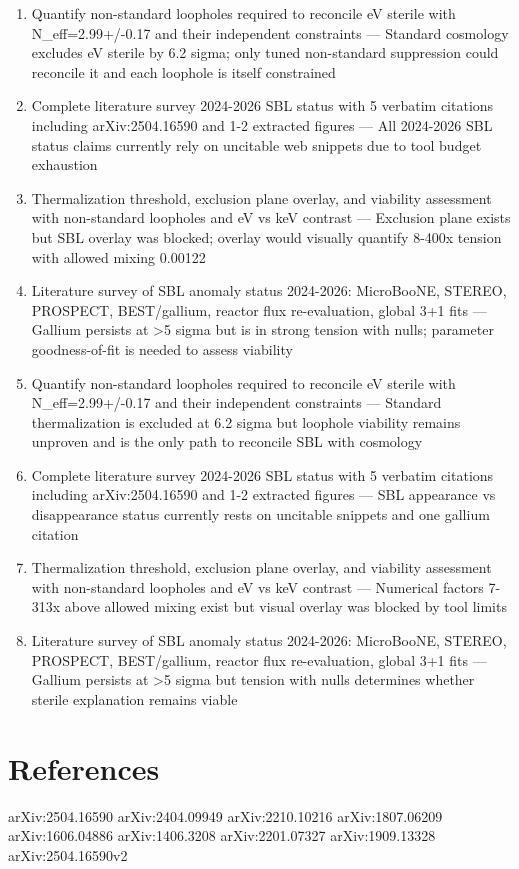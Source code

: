 \documentclass[11pt,a4paper]{article}
\begin{document}
\begin{enumerate}
  \item Quantify non-standard loopholes required to reconcile eV sterile with N\_eff=2.99+/-0.17 and their independent constraints --- Standard cosmology excludes eV sterile by 6.2 sigma; only tuned non-standard suppression could reconcile it and each loophole is itself constrained
  \item Complete literature survey 2024-2026 SBL status with 5 verbatim citations including arXiv:2504.16590 and 1-2 extracted figures --- All 2024-2026 SBL status claims currently rely on uncitable web snippets due to tool budget exhaustion
  \item Thermalization threshold, exclusion plane overlay, and viability assessment with non-standard loopholes and eV vs keV contrast --- Exclusion plane exists but SBL overlay was blocked; overlay would visually quantify 8-400x tension with allowed mixing 0.00122
  \item Literature survey of SBL anomaly status 2024-2026: MicroBooNE, STEREO, PROSPECT, BEST/gallium, reactor flux re-evaluation, global 3+1 fits --- Gallium persists at \textgreater{}5 sigma but is in strong tension with nulls; parameter goodness-of-fit is needed to assess viability
  \item Quantify non-standard loopholes required to reconcile eV sterile with N\_eff=2.99+/-0.17 and their independent constraints --- Standard thermalization is excluded at 6.2 sigma but loophole viability remains unproven and is the only path to reconcile SBL with cosmology
  \item Complete literature survey 2024-2026 SBL status with 5 verbatim citations including arXiv:2504.16590 and 1-2 extracted figures --- SBL appearance vs disappearance status currently rests on uncitable snippets and one gallium citation
  \item Thermalization threshold, exclusion plane overlay, and viability assessment with non-standard loopholes and eV vs keV contrast --- Numerical factors 7-313x above allowed mixing exist but visual overlay was blocked by tool limits
  \item Literature survey of SBL anomaly status 2024-2026: MicroBooNE, STEREO, PROSPECT, BEST/gallium, reactor flux re-evaluation, global 3+1 fits --- Gallium persists at \textgreater{}5 sigma but tension with nulls determines whether sterile explanation remains viable
\end{enumerate}
\section*{References}
arXiv:2504.16590 arXiv:2404.09949 arXiv:2210.10216 arXiv:1807.06209 arXiv:1606.04886 arXiv:1406.3208 arXiv:2201.07327 arXiv:1909.13328 arXiv:2504.16590v2
\end{document}
